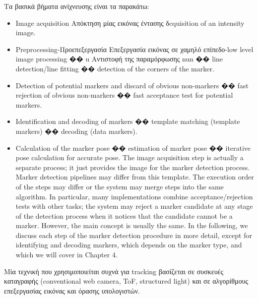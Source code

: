 Τα βασικά βήματα ανίχνευσης είναι τα παρακάτω:
\begin{itemize}


\item Image acquisition
Απόκτηση μίας εικόνας έντασης
δcquisition of an intensity image.
\item Preprocessing-Προεπεξεργασία
Επεξεργασία εικόνας σε χαμηλό επίπεδο-low level image processing
�� u Αντιστοφή της παραμόρφωσης nun
�� line detection/line fitting
�� detection of the corners of the marker.
\item Detection of potential markers and discard of obvious non-markers
�� fast rejection of obvious non-markers
�� fast acceptance test for potential markers.

\item Identification and decoding of markers
�� template matching (template markers)
�� decoding (data markers).
\item Calculation of the marker pose
�� estimation of marker pose
�� iterative pose calculation for accurate pose.
The image acquisition step is actually a separate process; it just provides the
image for the marker detection process. Marker detection pipelines may differ from
this template. The execution order of the steps may differ or the system may
merge steps into the same algorithm. In particular, many implementations combine
acceptance/rejection tests with other tasks; the system may reject a marker
candidate at any stage of the detection process when it notices that the candidate
cannot be a marker. However, the main concept is usually the same.
In the following, we discuss each step of the marker detection procedure in
more detail, except for identifying and decoding markers, which depends on the
marker type, and which we will cover in Chapter 4.
\end{itemize}
Μία τεχνική που χρησιμοποιείται συχνά για tracking βασίζεται σε συσκευές καταγραφής (conventional web camera, ToF, structured light) και σε αλγορίθμους επεξεργασίας εικόνας και όρασης υπολογιστών. 


